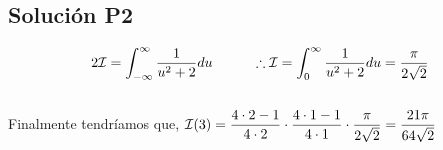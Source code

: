 \begin{CajaTitulo}{\begin{center}\subsection{Solución P2}\end{center}}
    \[2\mathcal{I} = \int_{-\infty}^{\infty}\frac{1}{u^2 + 2}du \hspace{1cm}\therefore\mathcal{I} = \int_{0}^{\infty}\frac{1}{u^2 + 2}du = \frac{\pi}{2\sqrt{2}}\]
    \\

    Finalmente tendríamos que, $\I(3) = \mathlarger{\frac{4\cdot 2 - 1}{4\cdot2} \cdot \frac{4\cdot1 - 1}{4\cdot1}\cdot  \frac{\pi}{2\sqrt{2}} = \frac{21\pi}{64\sqrt{2}}}$

    \vspace{6cm}
 
\end{CajaTitulo}